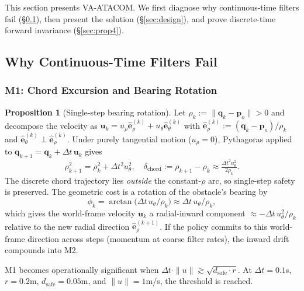 \documentclass[letterpaper]{article}
\begin{document}
This section presents VA-ATACOM. We first diagnose why continuous-time filters fail (\S\ref{sec:failure}), then present the solution (\S\ref{sec:design}), and prove discrete-time forward invariance (\S\ref{sec:prop4}).

\subsection{Why Continuous-Time Filters Fail}
\label{sec:failure}

\subsubsection{M1: Chord Excursion and Bearing Rotation}

\textbf{Proposition 1} (Single-step bearing rotation). Let $\rho_k := \|\boldsymbol{q}_k - \boldsymbol{p}_o\| > 0$ and decompose the velocity as $\boldsymbol{u}_k = u_\rho \hat{\boldsymbol{e}}_\rho^{(k)} + u_\theta \hat{\boldsymbol{e}}_\theta^{(k)}$ with $\hat{\boldsymbol{e}}_\rho^{(k)} := (\boldsymbol{q}_k - \boldsymbol{p}_o)/\rho_k$ and $\hat{\boldsymbol{e}}_\theta^{(k)} \perp \hat{\boldsymbol{e}}_\rho^{(k)}$. Under purely tangential motion ($u_\rho = 0$), Pythagoras applied to $\boldsymbol{q}_{k+1} = \boldsymbol{q}_k + \Delta t\,\boldsymbol{u}_k$ gives
\begin{equation}
\rho_{k+1}^2 = \rho_k^2 + \Delta t^2 u_\theta^2,\quad
\delta_\text{chord} := \rho_{k+1}{-}\rho_k \approx \tfrac{\Delta t^2 u_\theta^2}{2\rho_k}.
\label{eq:m1}
\end{equation}
The discrete chord trajectory lies \emph{outside} the constant-$\rho$ arc, so single-step safety is preserved. The geometric cost is a rotation of the obstacle's bearing by
\begin{equation}
\phi_k = \arctan\!\bigl(\Delta t\, u_\theta / \rho_k\bigr) \approx \Delta t\, u_\theta / \rho_k,
\label{eq:m1-rot}
\end{equation}
which gives the world-frame velocity $\boldsymbol{u}_k$ a radial-inward component $\approx -\Delta t\, u_\theta^2 / \rho_k$ relative to the new radial direction $\hat{\boldsymbol{e}}_\rho^{(k+1)}$. If the policy commits to this world-frame direction across steps (momentum at coarse filter rates), the inward drift compounds into M2.

M1 becomes operationally significant when $\Delta t \cdot \|u\| \gtrsim \sqrt{d_\text{safe} \cdot r}$. At $\Delta t = 0.1$s, $r = 0.2$m, $d_\text{safe} = 0.05$m, and $\|u\| = 1$m/s, the threshold is reached.
\end{document}
